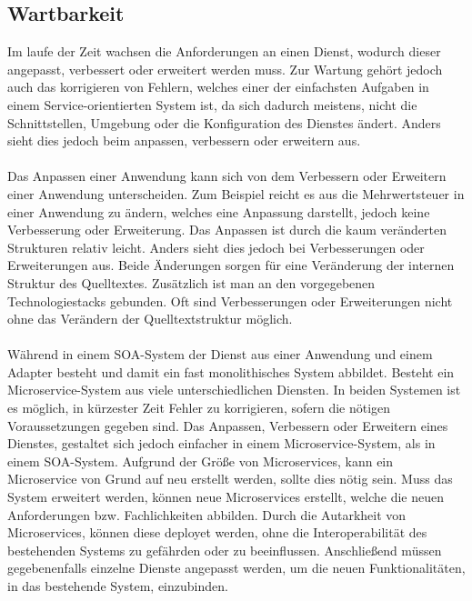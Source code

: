 \subsection{Wartbarkeit}
\label{subsec:Wartbarkeit}
Im laufe der Zeit wachsen die Anforderungen an einen Dienst, wodurch dieser angepasst, verbessert oder erweitert werden muss. Zur Wartung gehört jedoch auch das korrigieren von Fehlern, welches einer der einfachsten Aufgaben in einem Service-orientierten System ist, da sich dadurch meistens, nicht die Schnittstellen, Umgebung oder die Konfiguration des Dienstes ändert. Anders sieht dies jedoch beim anpassen, verbessern oder erweitern aus.
\\\\
Das Anpassen einer Anwendung kann sich von dem Verbessern oder Erweitern einer Anwendung unterscheiden. Zum Beispiel reicht es aus die Mehrwertsteuer in einer Anwendung zu ändern, welches eine Anpassung darstellt, jedoch keine Verbesserung oder Erweiterung. Das Anpassen ist durch die kaum veränderten Strukturen relativ leicht. Anders sieht dies jedoch bei Verbesserungen oder Erweiterungen aus. Beide Änderungen sorgen für eine Veränderung der internen Struktur des Quelltextes. Zusätzlich ist man an den vorgegebenen Technologiestacks gebunden. Oft sind Verbesserungen oder Erweiterungen nicht ohne das Verändern der Quelltextstruktur möglich.
\\\\
Während in einem SOA-System der Dienst aus einer Anwendung und einem Adapter besteht und damit ein fast monolithisches System abbildet. Besteht ein Microservice-System aus viele unterschiedlichen Diensten. In beiden Systemen ist es möglich, in kürzester Zeit Fehler zu korrigieren, sofern die nötigen Voraussetzungen gegeben sind. Das Anpassen, Verbessern oder Erweitern eines Dienstes, gestaltet sich jedoch einfacher in einem Microservice-System, als in einem SOA-System. Aufgrund der Größe von Microservices, kann ein Microservice von Grund auf neu erstellt werden, sollte dies nötig sein. Muss das System erweitert werden, können neue Microservices erstellt, welche die neuen Anforderungen bzw. Fachlichkeiten abbilden. Durch die Autarkheit von Microservices, können diese deployet werden, ohne die Interoperabilität des bestehenden Systems zu gefährden oder zu beeinflussen. Anschließend müssen gegebenenfalls einzelne Dienste angepasst werden, um die neuen Funktionalitäten, in das bestehende System, einzubinden.

